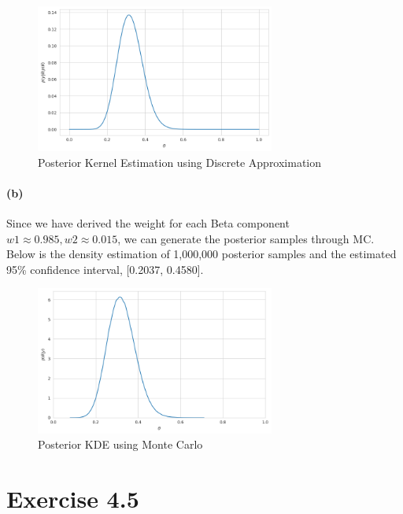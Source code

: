\documentclass[11pt, letterpaper]{article}
\begin{document}
\begin{figure}[!h]
  \centering
  \includegraphics[width=0.7\textwidth]{4.4.a.png}
  \captionsetup{justification=centering}
  \caption{Posterior Kernel Estimation using Discrete Approximation}
\end{figure}

\paragraph{(b)}
Since we have derived the weight for each Beta component $w1\approx0.985, w2\approx0.015$, we can generate the posterior samples through MC. Below is the density estimation of 1,000,000 posterior samples and the estimated 95\% confidence interval, [0.2037, 0.4580].

\begin{figure}[!h]
  \centering
  \includegraphics[width=0.7\textwidth]{4.4.b.png}
  \captionsetup{justification=centering}
  \caption{Posterior KDE using Monte Carlo}
\end{figure}


\section{Exercise 4.5}
\end{document}
